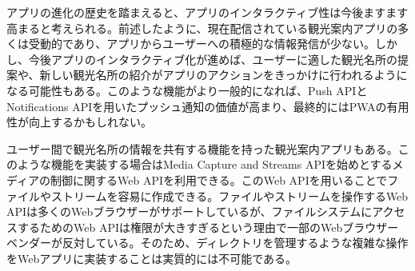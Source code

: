アプリの進化の歴史を踏まえると、アプリのインタラクティブ性は今後ますます高まると考えられる。前述したように、現在配信されている観光案内アプリの多くは受動的であり、アプリからユーザーへの積極的な情報発信が少ない。しかし、今後アプリのインタラクティブ化が進めば、ユーザーに適した観光名所の提案や、新しい観光名所の紹介がアプリのアクションをきっかけに行われるようになる可能性もある。このような機能がより一般的になれば、Push APIとNotifications APIを用いたプッシュ通知の価値が高まり、最終的にはPWAの有用性が向上するかもしれない。

ユーザー間で観光名所の情報を共有する機能を持った観光案内アプリもある。このような機能を実装する場合はMedia Capture and Streams APIを始めとするメディアの制御に関するWeb APIを利用できる。このWeb APIを用いることでファイルやストリームを容易に作成できる。ファイルやストリームを操作するWeb APIは多くのWebブラウザーがサポートしているが、ファイルシステムにアクセスするためのWeb APIは権限が大きすぎるという理由で一部のWebブラウザーベンダーが反対している。そのため、ディレクトリを管理するような複雑な操作をWebアプリに実装することは実質的には不可能である。
